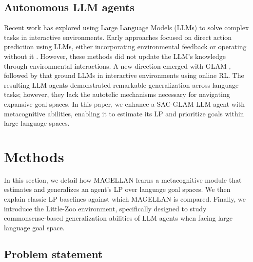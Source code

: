 \documentclass{article}
\begin{document}
\subsection{Autonomous LLM agents}
Recent work has explored using Large Language Models (LLMs) to solve complex tasks in interactive environments. Early approaches focused on direct action prediction using LLMs, either incorporating environmental feedback \cite{huang_language_2022, yao2022react, hao2023rap, shinn2023reflexion, wang_voyager_2023} or operating without it \cite{ahn_as_2022}. However, these methods did not update the LLM's knowledge through environmental interactions. A new direction emerged with GLAM \citep{carta_grounding_2023}, followed by \citep{wen_reinforcing_2024,wen_entropy-regularized_2024,zhou_archer_2024} that ground LLMs in interactive environments using online RL. The resulting LLM agents demonstrated remarkable generalization across language tasks; however, they lack the autotelic mechanisms necessary for navigating expansive goal spaces. In this paper, we enhance a SAC-GLAM \cite{gaven2024sacglam} LLM agent with metacognitive abilities, enabling it to estimate its LP and prioritize goals within large language spaces.


\section{Methods} \label{sec:methods}
In this section, we detail how MAGELLAN learns a metacognitive module that estimates and generalizes an agent's LP over language goal spaces. We then explain classic LP baselines against which MAGELLAN is compared. Finally, we introduce the Little-Zoo environment, specifically designed to study commonsense-based generalization abilities of LLM agents when facing large language goal space.


\subsection{Problem statement}


\end{document}
